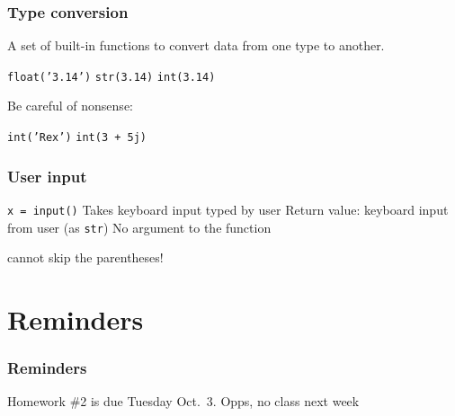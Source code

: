 \documentclass[11pt]{beamer}
\begin{document}
\begin{frame}
  \frametitle{Type conversion}
  \Enlarge

  \begin{itemize}
  \myitem  A set of built-in functions to convert data from one type to another. \pause
    \begin{itemize}
    \mysubitem  \texttt{float('3.14')} 
    \mysubitem  \texttt{str(3.14)}
    \mysubitem  \texttt{int(3.14)} 
    \end{itemize} \pause
  \myitem  Be careful of nonsense:
    \begin{itemize}
    \mysubitem  \texttt{int('Rex')}
    \mysubitem  \texttt{int(3 + 5j)}
    \end{itemize}
  \end{itemize}
\end{frame}

\begin{frame}
  \frametitle{User input}
  \Enlarge

  \begin{itemize}
  \myitem  \texttt{x = input()} \pause
  \myitem  Takes keyboard input typed by user \pause
  \myitem  Return value:  keyboard input from user (as \texttt{str})
  \myitem  No argument to the function \pause
  \begin{itemize}
  	\mysubitem \textcolor{CS101GradBot}{cannot skip the parentheses! }
  \end{itemize}
  \end{itemize}
\end{frame}

\section{Reminders}

\begin{frame}
  \frametitle{Reminders}
  \Enlarge

  \begin{itemize}
  \myitem Homework \#2 is due Tuesday Oct.\ 3. \pause
  \myitem Opps, no class next week
  \end{itemize}
\end{frame}
\end{document}
